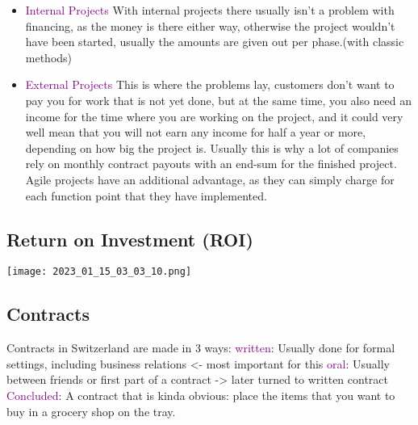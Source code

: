 \documentclass[main.tex,fontsize=12pt,paper=a4,paper=landscape,DIV=calc,]{scrartcl}
\begin{document}
\begin{multicols*}{2}
\begin{itemize}
\item \textcolor{purple}{Internal Projects}\newline
  With internal projects there usually isn't a problem with financing, as the money is there either way, otherwise the project wouldn't have been started, usually the amounts are given out per phase.(with classic methods)
\item \textcolor{purple}{External Projects}\newline
  This is where the problems lay, customers don't want to pay you for work that is not yet done, but at the same time, you also need an income for the time where you are working on the project, and it could very well mean that you will not earn any income for half a year or more, depending on how big the project is.\newline
  Usually this is why a lot of companies rely on monthly contract payouts with an end-sum for the finished project.\newline
  Agile projects have an additional advantage, as they can simply charge for each function point that they have implemented.
\end{itemize} 

\subsection{Return on Investment (ROI)}
\texttt{[image: 2023\_01\_15\_03\_03\_10.png]}

\subsection{Contracts}
Contracts in Switzerland are made in 3 ways:\newline
\textcolor{purple}{written}: \newline
Usually done for formal settings, including business relations <- most important for this \newline
\textcolor{purple}{oral}:\newline
Usually between friends or first part of a contract -> later turned to written contract\newline
\textcolor{purple}{Concluded}:\newline
A contract that is kinda obvious: place the items that you want to buy in a grocery shop on the tray.


\end{multicols*}
\end{document}
